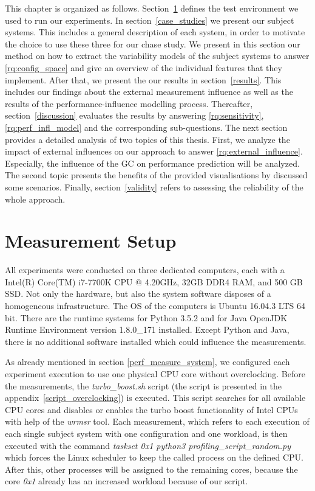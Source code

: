 This chapter is organized as follows. Section~\ref{test_env} defines the test environment we used to run our experiments. In section~\ref{case_studies} we present our subject systems. This includes a general description of each system, in order to motivate the choice to use these three for our chase study. We present in this section our method on how to extract the variability models of the subject systems to answer \ref{rq:config_space} and give an overview of the individual features that they implement. After that, we present the our results in section~\ref{results}. This includes our findings about the external measurement influence as well as the results of the performance-influence modelling process. Thereafter, section~\ref{discussion} evaluates the results by answering \ref{rq:sensitivity}, \ref{rq:perf_infl_model} and the corresponding sub-questions. The next section provides a detailed analysis of two topics of this thesis. First, we analyze the impact of external influences on our approach to answer \ref{rq:external_influence}. Especially, the influence of the \ac{GC} on performance prediction will be analyzed. The second topic presents the benefits of the provided visualisations by discussed some scenarios. Finally, section~\ref{validity} refers to assessing the reliability of the whole approach. 


\section{Measurement Setup}
\label{test_env}

All experiments were conducted on three dedicated computers, each with a Intel(R) Core(TM) i7-7700K CPU @ 4.20GHz, 32GB DDR4 RAM, and 500 GB SSD. Not only the hardware, but also the system software disposes of a homogeneous infrastructure. The \ac{OS} of the computers is Ubuntu 16.04.3 LTS 64 bit. There are the runtime systems for Python 3.5.2 and for Java OpenJDK Runtime Environment version 1.8.0\_171 installed. Except Python and Java, there is no additional software installed which could influence the measurements. 

As already mentioned in section \ref{perf_measure_system}, we configured each experiment execution to use one physical CPU core without overclocking. Before the measurements, the \emph{turbo\_boost.sh} script (the script is presented in the appendix~\ref{script_overclocking}) is executed. This script searches for all available CPU cores and disables or enables the turbo boost functionality of Intel CPUs with help of the \emph{wrmsr} tool. Each measurement, which refers to each execution of each single subject system with one configuration and one workload, is then executed with the command \emph{taskset 0x1 python3 profiling\_script\_random.py} which forces the Linux scheduler to keep the called process on the defined CPU. After this, other processes will be assigned to the remaining cores, because the core \emph{0x1} already has an increased workload because of our script.


